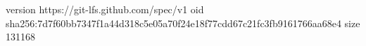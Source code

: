 version https://git-lfs.github.com/spec/v1
oid sha256:7d7f60bb7347f1a44d318c5e05a70f24e18f77cdd67c21fc3fb9161766aa68e4
size 131168
